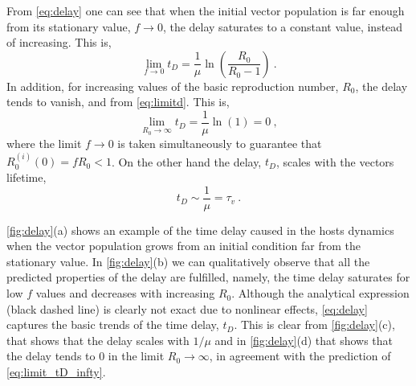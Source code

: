 From \cref{eq:delay} one can see that when the initial vector population
is far enough from its stationary value, $f\rightarrow 0$, the delay saturates
to a constant value, instead of increasing. This is,
\begin{equation}
    \lim_{f\to0}t_D=\frac{1}{\mu}\ln(\frac{R_0}{R_0-1}) \ .
    \label{eq:limitd}
\end{equation}
In addition, for increasing values of the basic reproduction number, $R_0$,
the delay tends to vanish, and from \cref{eq:limitd}. This is,
\begin{equation}
    \label{eq:limit_tD_infty}
    \lim_{R_0\to\infty}t_D=\frac{1}{\mu}\ln(1)=0\ ,
\end{equation}
where the limit $f\rightarrow 0$ is taken simultaneously to guarantee that
$R_0^{(i)}(0)=f R_0<1$. On the other hand the delay, $t_D$, scales with the
vectors lifetime,
\begin{equation}
    t_D\sim\frac{1}{\mu}=\tau_v \ .
\end{equation}

\cref{fig:delay}(a) shows an example of the time delay caused in the hosts
dynamics when the vector population grows from an initial condition far from
the stationary value. In \cref{fig:delay}(b) we can qualitatively observe that
all the predicted properties of the delay are fulfilled, namely, the time delay
saturates for low $f$ values and decreases with increasing $R_0$. Although the
analytical expression (black dashed line) is clearly not exact due to nonlinear
effects, \cref{eq:delay} captures the basic trends of the time delay, $t_D$.
This is clear from \cref{fig:delay}(c), that shows that the delay scales with
$1/\mu$ and in \cref{fig:delay}(d) that shows that the delay tends to $0$ in
the limit $R_0\rightarrow\infty$, in agreement with the prediction of
\cref{eq:limit_tD_infty}.

